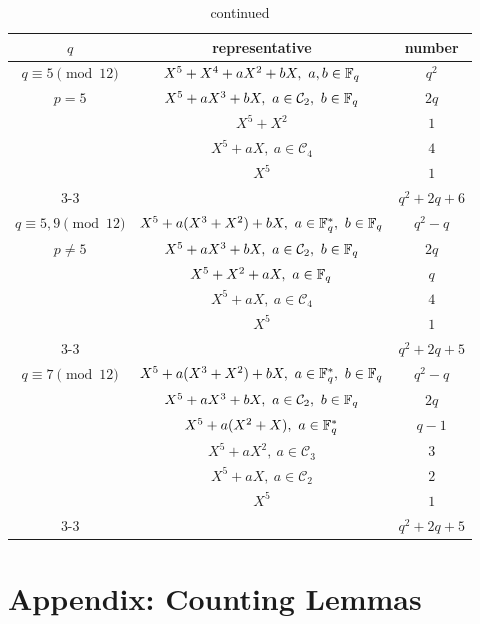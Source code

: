 \documentclass{amsart}
\numberwithin{equation}{section}
\theoremstyle{definition}
\newcommand{\f}{\Bbb F}
\begin{document}
\addtocounter{table}{-1}

\begin{table}[h]
\caption{continued}\label{Tb-q5-c}
   \renewcommand*{\arraystretch}{1.2}
    \centering
     \begin{tabular}{c|c|c}
     \hline
     	$q$ & representative & number \\ \hline 
	    $q\equiv 5\pmod{12}$ & $X^5+X^4+aX^2+bX,\ a,b\in\f_q$ & $q^2$ \\
	    $p=5$ & $X^5+aX^3+bX,\ a\in\mathcal C_2,\ b\in\f_q$ & $2q$ \\
	    & $X^5+X^2$ & $1$ \\
	    & $X^5+aX,\ a\in\mathcal C_4$ & $4$ \\
	    & $X^5$ & $1$ \\ \cline{3-3}
	    & & $q^2+2q+6$ \\  \hline
	    $q\equiv 5,9\pmod{12}$ & $X^5+a(X^3+X^2)+bX,\ a\in\f_q^*,\ b\in\f_q$ & $q^2-q$ \\
	    $p\ne 5$ & $X^5+aX^3+bX,\ a\in\mathcal C_2,\ b\in\f_q$ & $2q$ \\
	    & $X^5+X^2+aX,\ a\in\f_q$ & $q$ \\
	    & $X^5+aX,\ a\in\mathcal C_4$ & $4$ \\
	    & $X^5$ & $1$ \\ \cline{3-3}
	    & & $q^2+2q+5$ \\  \hline
	    $q\equiv 7\pmod{12}$ & $X^5+a(X^3+X^2)+bX,\ a\in\f_q^*,\ b\in\f_q$ & $q^2-q$ \\
	    & $X^5+aX^3+bX,\ a\in\mathcal C_2,\ b\in\f_q$ & $2q$ \\
	    & $X^5+a(X^2+X),\ a\in\f_q^*$ & $q-1$ \\
	    & $X^5+aX^2,\ a\in\mathcal C_3$ & $3$ \\
	    & $X^5+aX,\ a\in\mathcal C_2$ & $2$ \\
	    & $X^5$ & $1$ \\ \cline{3-3}
	    & & $q^2+2q+5$ \\  \hline
	\end{tabular}
\end{table}



\newenvironment{Alem}
	{\medskip
	\refstepcounter{apdx}
	\noindent
	{\bf Lemma A\theapdx.}
	\em
	}
	{\medskip
	}
	
	
\section*{Appendix: Counting Lemmas}
\end{document}
